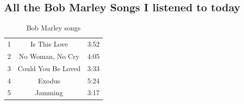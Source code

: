 \documentclass{article}
\begin{document}
\subsection{All the Bob Marley Songs I listened to today}

\begin{table}[h]
  \centering
    \begin{tabular}{| l c r |}
    \hline
    1 & Is This Love & 3:52\\
    2 & No Woman, No Cry & 4:05\\
    3 & Could You Be Loved & 3:33\\
    4 & Exodus & 5:24\\
    5 & Jamming & 3:17\\	
    \hline
    \end{tabular}
  \caption{Bob Marley songs}
\end{table}
\end{document}
